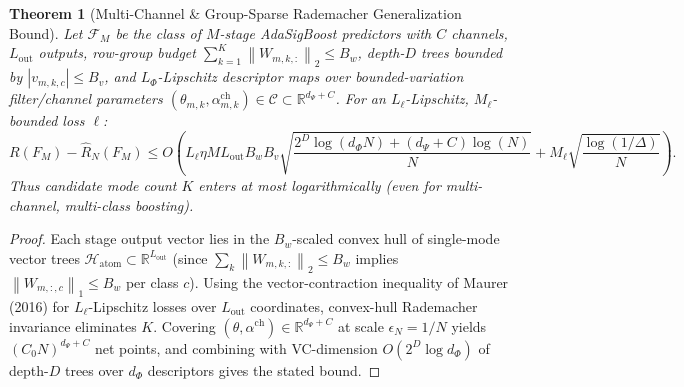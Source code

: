 \documentclass[11pt]{article}
\newtheorem{theorem}{Theorem}
\newcommand{\R}{\mathbb{R}}
\newcommand{\norm}[1]{\left\lVert #1 \right\rVert}
\newcommand{\abs}[1]{\left\lvert #1 \right\rvert}
\begin{document}
\begin{theorem}[Multi-Channel \& Group-Sparse Rademacher Generalization Bound]
\label{thm:generalization}
Let $\mathcal{F}_M$ be the class of $M$-stage AdaSigBoost predictors with $C$ channels, $L_{\mathrm{out}}$ outputs, row-group budget $\sum_{k=1}^K \norm{W_{m,k,:}}_2 \le B_w$, depth-$D$ trees bounded by $\abs{v_{m,k,c}} \le B_v$, and $L_\Phi$-Lipschitz descriptor maps over bounded-variation filter/channel parameters $(\theta_{m,k}, \alpha_{m,k}^{\mathrm{ch}}) \in \mathcal{C} \subset \R^{d_\Psi + C}$. For an $L_\ell$-Lipschitz, $M_\ell$-bounded loss $\ell$:
\begin{equation}
    R(F_M) - \hat{R}_N(F_M) \le O\!\left( L_\ell \eta M L_{\mathrm{out}} B_w B_v \sqrt{\frac{2^D \log(d_\Phi N) + (d_\Psi + C)\log(N)}{N}} + M_\ell \sqrt{\frac{\log(1/\Delta)}{N}} \right).
\end{equation}
Thus candidate mode count $K$ enters at most logarithmically (even for multi-channel, multi-class boosting).
\end{theorem}
\begin{proof}
Each stage output vector lies in the $B_w$-scaled convex hull of single-mode vector trees $\mathcal{H}_{\mathrm{atom}} \subset \R^{L_{\mathrm{out}}}$ (since $\sum_k \norm{W_{m,k,:}}_2 \le B_w$ implies $\norm{W_{m,:,c}}_1 \le B_w$ per class $c$). Using the vector-contraction inequality of Maurer (2016) for $L_\ell$-Lipschitz losses over $L_{\mathrm{out}}$ coordinates, convex-hull Rademacher invariance eliminates $K$. Covering $(\theta, \alpha^{\mathrm{ch}}) \in \R^{d_\Psi + C}$ at scale $\epsilon_N = 1/N$ yields $(C_0 N)^{d_\Psi + C}$ net points, and combining with VC-dimension $O(2^D \log d_\Phi)$ of depth-$D$ trees over $d_\Phi$ descriptors gives the stated bound.
\end{proof}
\end{document}
